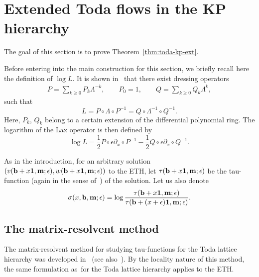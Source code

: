 \documentclass[pdftex]{sigma}
\newcommand{\e}{\epsilon}
\newcommand{\p}{\partial}
\newcommand{\beq}{\begin{equation}}
\newcommand{\eeq}{\end{equation}}
\numberwithin{equation}{section}
\begin{document}
\section{Extended Toda flows in the KP hierarchy}\label{sectionTodaext}
The goal of this section is to prove Theorem~\ref{thm:toda-kp-ext}.

Before entering into the main construction for this section, we briefly recall here the definition of $\log L$.
It is shown in~\cite{CDZ} that there exist dressing operators
\begin{align*}%
P= \sum_{k\ge0} P_k \Lambda^{-k}, \qquad P_0= 1,\qquad
Q= \sum_{k\ge0} Q_k \Lambda^k, %
\end{align*}
such that
\[
L=P\circ\Lambda\circ P^{-1}=Q\circ\Lambda^{-1}\circ Q^{-1}.
\]
Here, $P_k$, $Q_k$ belong to a certain extension of the differential polynomial ring.
The logarithm of the Lax operator is then defined by~\cite{CDZ}
\[
\log L= \frac12 P\circ \e\p_x \circ P^{-1} - \frac12 Q\circ \e\p_x \circ Q^{-1}.
\]

As in the introduction, for an arbitrary solution $(v({\bf b}+x{\bf 1}, {\bf m};\e), w({\bf b}+x{\bf 1}, {\bf m};\e))$ to the ETH,
let $\tau({\bf b}+x{\bf 1}, {\bf m};\e)$ be the tau-function (again in the sense of~\cite{CDZ, DZ-toda})
 of the solution. Let us also denote
 \beq\label{defsigma}
 \sigma(x, {\bf b}, {\bf m};\e) = \log\frac{\tau({\bf b}+x{\bf 1}, {\bf m};\e)}{\tau({\bf b}+(x+\e){\bf 1}, {\bf m};\e)}.
 \eeq

\subsection{The matrix-resolvent method}
The matrix-resolvent method for studying tau-functions for the Toda lattice hierarchy was developed in~\cite{DY} (see also~\cite{Y}).
By the locality nature of this method, the same formulation as~for the Toda lattice hierarchy
applies to the ETH.
\end{document}
